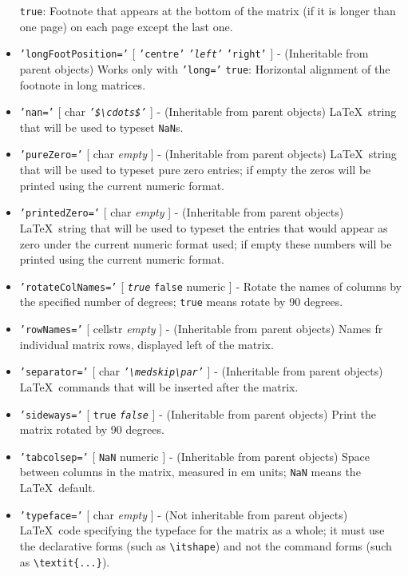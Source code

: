\begin{itemize}
   \texttt{true}: Footnote that appears at the bottom of the matrix (if
   it is longer than one page) on each page except the last one.
 \item
   \texttt{'longFootPosition='} {[} \texttt{'centre'} \textbar{}
   \emph{\texttt{'left'}} \textbar{} \texttt{'right'} {]} - (Inheritable
   from parent objects) Works only with \texttt{'long='} \texttt{true}:
   Horizontal alignment of the footnote in long matrices.
 \item
   \texttt{'nan='} {[} char \textbar{}
   \emph{\texttt{'\$\textbackslash{}cdots\$'}} {]} - (Inheritable from
   parent objects) \LaTeX~string that will be used to typeset
   \texttt{NaN}s.
 \item
   \texttt{'pureZero='} {[} char \textbar{} \emph{empty} {]} -
   (Inheritable from parent objects) \LaTeX~string that will be used to
   typeset pure zero entries; if empty the zeros will be printed using
   the current numeric format.
 \item
   \texttt{'printedZero='} {[} char \textbar{} \emph{empty} {]} -
   (Inheritable from parent objects) \LaTeX~string that will be used to
   typeset the entries that would appear as zero under the current
   numeric format used; if empty these numbers will be printed using the
   current numeric format.
 \item
   \texttt{'rotateColNames='} {[} \emph{\texttt{true}} \textbar{}
   \texttt{false} \textbar{} numeric {]} - Rotate the names of columns by
   the specified number of degrees; \texttt{true} means rotate by 90
   degrees.
 \item
   \texttt{'rowNames='} {[} cellstr \textbar{} \emph{empty} {]} -
   (Inheritable from parent objects) Names fr individual matrix rows,
   displayed left of the matrix.
 \item
   \texttt{'separator='} {[} char \textbar{}
   \emph{\texttt{'\textbackslash{}medskip\textbackslash{}par'}} {]} -
   (Inheritable from parent objects) \LaTeX~commands that will be
   inserted after the matrix.
 \item
   \texttt{'sideways='} {[} \texttt{true} \textbar{}
   \emph{\texttt{false}} {]} - (Inheritable from parent objects) Print
   the matrix rotated by 90 degrees.
 \item
   \texttt{'tabcolsep='} {[} \texttt{NaN} \textbar{} numeric {]} -
   (Inheritable from parent objects) Space between columns in the matrix,
   measured in em units; \texttt{NaN} means the \LaTeX~default.
 \item
   \texttt{'typeface='} {[} char \textbar{} \emph{empty} {]} - (Not
   inheritable from parent objects) \LaTeX~code specifying the typeface
   for the matrix as a whole; it must use the declarative forms (such as
   \texttt{\textbackslash{}itshape}) and not the command forms (such as
   \texttt{\textbackslash{}textit\{...\}}).
 \end{itemize}
 
